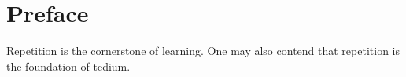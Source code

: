 \chapter*{Preface}

Repetition is the cornerstone of learning. One may also contend that repetition is the foundation of tedium. 

\endinput